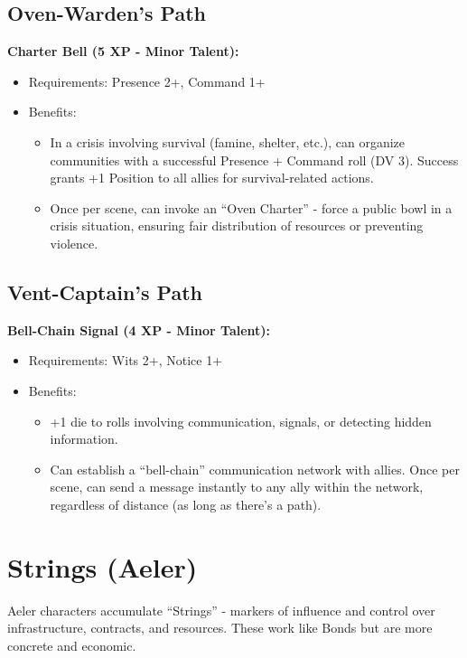 \documentclass[11pt]{article}
\newcommand{\talent}[1]{\textbf{#1}}
\begin{document}
\subsection*{Oven-Warden's Path}
\talent{Charter Bell (5 XP - Minor Talent):}
\begin{itemize}
  \item Requirements: Presence 2+, Command 1+
  \item Benefits:
    \begin{itemize}
      \item In a crisis involving survival (famine, shelter, etc.), can organize communities with a successful Presence + Command roll (DV 3). Success grants +1 Position to all allies for survival-related actions.
      \item Once per scene, can invoke an ``Oven Charter'' - force a public bowl in a crisis situation, ensuring fair distribution of resources or preventing violence.
    \end{itemize}
\end{itemize}

\subsection*{Vent-Captain's Path}
\talent{Bell-Chain Signal (4 XP - Minor Talent):}
\begin{itemize}
  \item Requirements: Wits 2+, Notice 1+
  \item Benefits:
    \begin{itemize}
      \item +1 die to rolls involving communication, signals, or detecting hidden information.
      \item Can establish a ``bell-chain'' communication network with allies. Once per scene, can send a message instantly to any ally within the network, regardless of distance (as long as there's a path).
    \end{itemize}
\end{itemize}

\section*{Strings (Aeler)}
Aeler characters accumulate ``Strings'' - markers of influence and control over infrastructure, contracts, and resources. These work like Bonds but are more concrete and economic.
\end{document}

